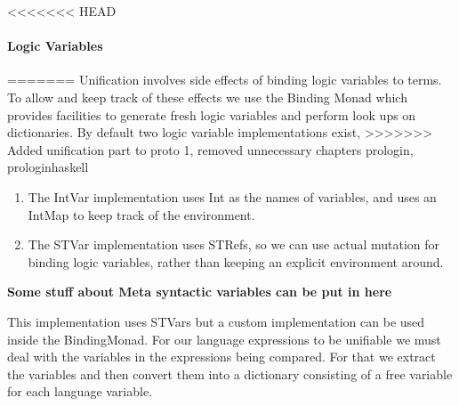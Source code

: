 \documentclass[thesis-solanki.tex]{subfiles}
\begin{document}
<<<<<<< HEAD
\paragraph{Logic Variables}
=======
Unification involves side effects of binding logic variables to terms. To allow and keep track of these effects we use the Binding Monad 
which provides facilities to generate fresh logic variables and perform look ups on dictionaries. By default two logic variable 
implementations exist,
>>>>>>> Added unification part to proto 1, removed unnecessary chapters prologin, prologinhaskell

\begin{enumerate}
\item The IntVar implementation uses Int as the names of variables, and uses an 
IntMap to keep track of the environment. 

\item The STVar implementation uses STRefs, so we can use actual mutation for binding logic variables, 
rather than keeping an explicit environment around. 

\end{enumerate}     

\textbf{Some stuff about Meta syntactic variables can be put in here}

This implementation uses STVars but a custom implementation can be used inside the BindingMonad.
For our language expressions to be unifiable we must deal with the variables in the expressions being compared. For that we extract the 
variables and then convert them into a dictionary consisting of a free variable for each language variable.
\end{document}
